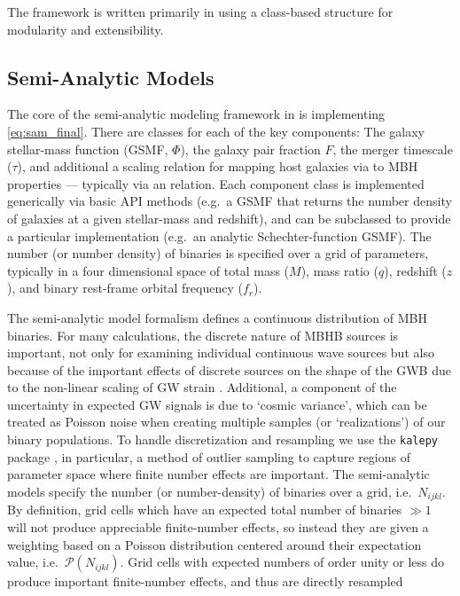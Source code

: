 \documentclass[useAMS, usenatbib]{mnras}
\begin{document}
    The \holodeck{} framework is written primarily in \python{} using a class-based structure for modularity and extensibility.

    \subsection{Semi-Analytic Models}
        \label{sec:imp_sam}

        The core of the semi-analytic modeling framework in \holodeck{} is implementing \eqref{eq:sam_final}.  There are classes for each of the key components: The galaxy stellar-mass function (GSMF, $\Phi$), the galaxy pair fraction \(F\), the merger timescale ($\tau$), and additional a scaling relation for mapping host galaxies via to MBH properties --- typically via an \mmbulge{} relation.  Each component class is implemented generically via basic API methods (e.g.~a GSMF that returns the number density of galaxies at a given stellar-mass and redshift), and can be subclassed to provide a particular implementation (e.g.~an analytic Schechter-function GSMF).  The number (or number density) of binaries is specified over a grid of parameters, typically in a four dimensional space of total mass ($M$), mass ratio ($q$), redshift ($z$), and binary rest-frame orbital frequency ($f_r$).

        The semi-analytic model formalism defines a continuous distribution of MBH binaries.  For many calculations, the discrete nature of MBHB sources is important, not only for examining individual continuous wave sources but also because of the important effects of discrete sources on the shape of the GWB due to the non-linear scaling of GW strain \citep{Sesana+2008}.  Additional, a component of the uncertainty in expected GW signals is due to `cosmic variance', which can be treated as Poisson noise when creating multiple samples (or `realizations') of our binary populations.  To handle discretization and resampling we use the \texttt{kalepy} package \citep{kalepy2021}, in particular, a method of outlier sampling to capture regions of parameter space where finite number effects are important.  The \holodeck{} semi-analytic models specify the number (or number-density) of binaries over a grid, i.e.~$N_{ijkl}$.  By definition, grid cells which have an expected total number of binaries $\gg 1$ will not produce appreciable finite-number effects, so instead they are given a weighting based on a Poisson distribution centered around their expectation value, i.e.~$\mathcal{P}(N_{ijkl})$.  Grid cells with expected numbers of order unity or less do produce important finite-number effects, and thus are directly resampled
\end{document}
